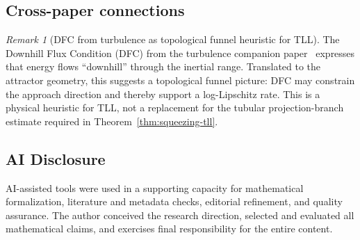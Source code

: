 \documentclass[12pt,a4paper]{article}
\theoremstyle{definition}
\theoremstyle{plain}
\theoremstyle{remark}
\newtheorem{remark}[definition]{Remark}
\begin{document}
\subsection{Cross-paper connections}

\begin{remark}[DFC from turbulence as topological funnel heuristic for TLL]
\label{rem:dfc-funnel}
The Downhill Flux Condition (DFC) from the turbulence companion paper~\cite{FST-NS2026} expresses that energy flows ``downhill'' through the inertial range. Translated to the attractor geometry, this suggests a topological funnel picture: DFC may constrain the approach direction and thereby support a log-Lipschitz rate. This is a physical heuristic for TLL, not a replacement for the tubular projection-branch estimate required in Theorem~\ref{thm:squeezing-tll}.
\end{remark}


\subsection*{AI Disclosure}
AI-assisted tools were used in a supporting capacity for mathematical
formalization, literature and metadata checks, editorial refinement, and
quality assurance.  The author conceived the research direction, selected
and evaluated all mathematical claims, and exercises final responsibility
for the entire content.
\end{document}
